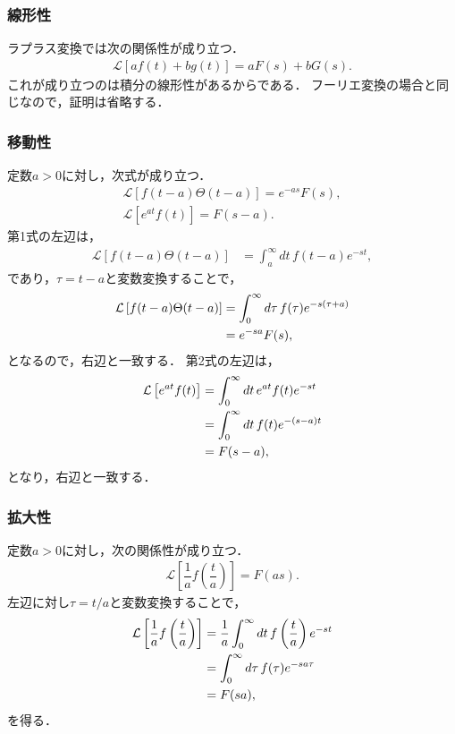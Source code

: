 \subsubsection{線形性}
%
ラプラス変換では次の関係性が成り立つ．
\begin{align}
  \mathcal{L}\left[af(t)+bg(t)\right] = aF(s) + bG(s). 
\end{align}
これが成り立つのは積分の線形性があるからである．
フーリエ変換の場合と同じなので，証明は省略する．
%
\subsubsection{移動性}
%
定数$a>0$に対し，次式が成り立つ．
\begin{align}
  \mathcal{L}\left[f(t-a)\Theta(t-a)\right] = e^{-as}F(s), \\
  \mathcal{L}\left[e^{at}f(t)\right]   = F(s-a).
\end{align}
第1式の左辺は，
\begin{align}
 \mathcal{L}\left[f(t-a)\Theta(t-a)\right] &= \int_{a}^{\infty}dt\, f(t-a)e^{-st}, 
\end{align}
であり，$\tau=t-a$と変数変換することで，
\begin{align}
 \mathcal{L}\left[f(t-a)\Theta(t-a)\right] 
  &= \int_{0}^{\infty}d\tau \,f(\tau)e^{-s(\tau + a)} \notag \\
  &= e^{-sa}F(s),
\end{align}
となるので，右辺と一致する．
第2式の左辺は，
\begin{align}
  \mathcal{L}\left[e^{at}f(t)\right] 
  &= \int_{0}^{\infty}dt\,e^{at}f(t)e^{-st} \notag \\
  &= \int_{0}^{\infty}dt\,f(t)e^{-(s-a)t} \notag \\
  &= F(s-a), 
\end{align}
となり，右辺と一致する．
%
\subsubsection{拡大性}
%
定数$a>0$に対し，次の関係性が成り立つ．
\begin{align}
 \mathcal{L}\left[\dfrac{1}{a}f\left(\dfrac{t}{a}\right)\right] = F(as). 
\end{align}
左辺に対し$\tau=t/a$と変数変換することで，
\begin{align}
 \mathcal{L}\left[\dfrac{1}{a}f\left(\dfrac{t}{a}\right)\right]
 &= \dfrac{1}{a}\int_{0}^{\infty}dt\,f\left(\dfrac{t}{a}\right)e^{-st} \notag \\
 &= \int_{0}^{\infty}d\tau \, f(\tau)e^{-sa\tau} \notag \\
 &= F(sa),
\end{align}
を得る．
%
